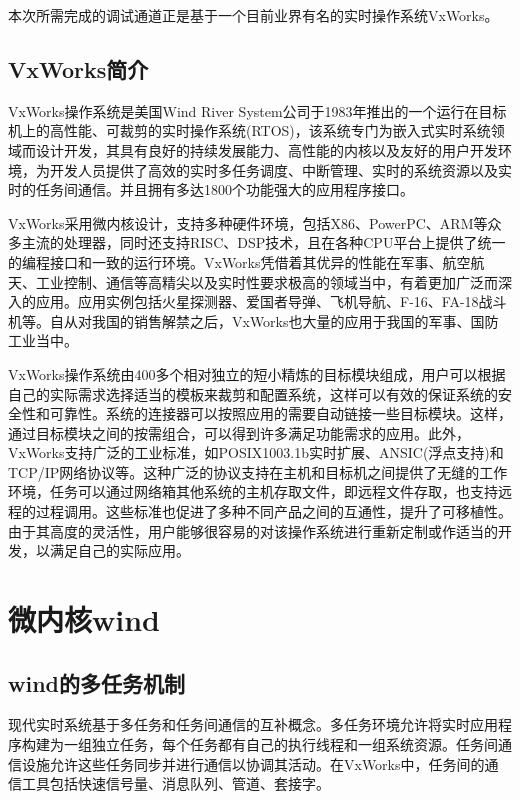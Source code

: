 本次所需完成的调试通道正是基于一个目前业界有名的实时操作系统VxWorks。

\subsection{VxWorks简介}
	VxWorks操作系统是美国Wind River System公司于1983年推出的一个运行在目标机上的高性能、可裁剪的实时操作系统(RTOS)，该系统专门为嵌入式实时系统领域而设计开发，其具有良好的持续发展能力、高性能的内核以及友好的用户开发环境，为开发人员提供了高效的实时多任务调度、中断管理、实时的系统资源以及实时的任务间通信。并且拥有多达1800个功能强大的应用程序接口\cite{嵌入式实时操作系统VxWorks及其开发环境Tornado}。
	
	VxWorks采用微内核设计，支持多种硬件环境，包括X86、PowerPC、ARM等众多主流的处理器，同时还支持RISC、DSP技术，且在各种CPU平台上提供了统一的编程接口和一致的运行环境。VxWorks凭借着其优异的性能在军事、航空航天、工业控制、通信等高精尖以及实时性要求极高的领域当中，有着更加广泛而深入的应用。应用实例包括火星探测器、爱国者导弹、飞机导航、F-16、FA-18战斗机等\cite{嵌入式实时操作系统VxWorks及其开发环境Tornado}。自从对我国的销售解禁之后，VxWorks也大量的应用于我国的军事、国防工业当中。
	
	VxWorks操作系统由400多个相对独立的短小精炼的目标模块组成，用户可以根据自己的实际需求选择适当的模板来裁剪和配置系统，这样可以有效的保证系统的安全性和可靠性。系统的连接器可以按照应用的需要自动链接一些目标模块。这样，通过目标模块之间的按需组合，可以得到许多满足功能需求的应用。此外，VxWorks支持广泛的工业标准，如POSIX1003.1b实时扩展、ANSIC(浮点支持)和TCP/IP网络协议等。这种广泛的协议支持在主机和目标机之间提供了无缝的工作环境，任务可以通过网络箱其他系统的主机存取文件，即远程文件存取，也支持远程的过程调用。这些标准也促进了多种不同产品之间的互通性，提升了可移植性。由于其高度的灵活性，用户能够很容易的对该操作系统进行重新定制或作适当的开发，以满足自己的实际应用。

\section{微内核wind}

\subsection{wind的多任务机制}
现代实时系统基于多任务和任务间通信的互补概念。多任务环境允许将实时应用程序构建为一组独立任务，每个任务都有自己的执行线程和一组系统资源。任务间通信设施允许这些任务同步并进行通信以协调其活动。在VxWorks中，任务间的通信工具包括快速信号量、消息队列、管道、套接字。

